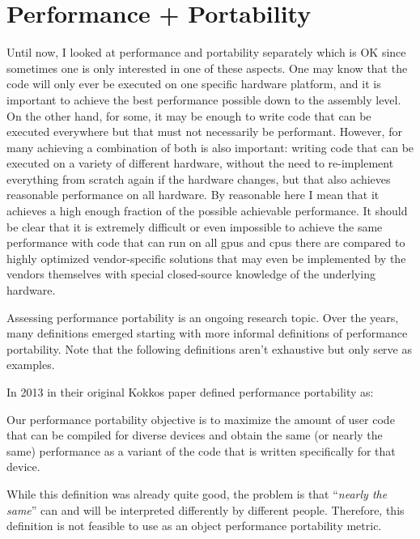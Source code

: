 \section{Performance + Portability}


Until now, I looked at performance and portability separately which is OK since sometimes one is only interested in one of these aspects. 
One may know that the code will only ever be executed on one specific hardware platform, and it is important to achieve the best performance possible down to the assembly level. 
On the other hand, for some, it may be enough to write code that can be executed everywhere but that must not necessarily be performant. 
However, for many achieving a combination of both is also important: writing code that can be executed on a variety of different hardware, without the need to re-implement everything from scratch again if the hardware changes, but that also achieves reasonable performance on all hardware. 
By reasonable here I mean that it achieves a high enough fraction of the possible achievable performance. 
It should be clear that it is extremely difficult or even impossible to achieve the same performance with code that can run on all \glspl{gpu} and \glspl{cpu} there are compared to highly optimized vendor-specific solutions that may even be implemented by the vendors themselves with special closed-source knowledge of the underlying hardware. 

Assessing performance portability is an ongoing research topic. 
Over the years, many definitions emerged starting with more informal definitions of performance portability. 
Note that the following definitions aren't exhaustive but only serve as examples.




In 2013 in their original Kokkos paper \citeauthor{edwards_kokkos_2013} defined performance portability as:
\begin{quotebox}{\citet{edwards_kokkos_2013}}
    Our performance portability objective is to maximize the amount of user code that can be compiled for diverse devices and obtain the same (or nearly the same) performance as a variant of the code that is written specifically for that device.
\end{quotebox}
While this definition was already quite good, the problem is that \enquote{\textit{nearly the same}} can and will be interpreted differently by different people. 
Therefore, this definition is not feasible to use as an object performance portability metric.

